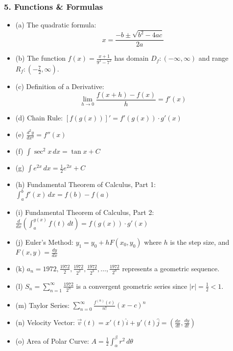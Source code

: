 \documentclass[a4paper,15pt]{article}
\begin{document}
\subsubsection*{5. Functions \& Formulas}
\begin{itemize}
    \item (a) The quadratic formula:
    \[
    x = \frac{-b \pm \sqrt{b^2 - 4ac}}{2a}
    \]
    \item (b) The function \(f(x) = \frac{x + 1}{9^2 - 7^2}\) has domain \(D_f : (-\infty, \infty)\) and range \(R_f : \left(-\frac{7}{2}, \infty\right)\).
    \item (c) Definition of a Derivative:
    \[
    \lim_{h \to 0} \frac{f(x + h) - f(x)}{h} = f'(x)
    \]
    \item (d) Chain Rule: \([f(g(x))]' = f'(g(x)) \cdot g'(x)\)
    \item (e) \(\frac{d^2y}{dx^2} = f''(x)\)
    \item (f) \(\int \sec^2 x \, dx = \tan x + C\)
    \item (g) \(\int e^{2x} \, dx = \frac{1}{2}e^{2x} + C\)
    \item (h) Fundamental Theorem of Calculus, Part 1: \(\int_a^b f'(x) \, dx = f(b) - f(a)\)
    \item (i) Fundamental Theorem of Calculus, Part 2: \(\frac{d}{dx} \left( \int_a^{g(x)} f(t) \, dt \right) = f(g(x)) \cdot g'(x)\)
    \item (j) Euler’s Method: \(y_1 = y_0 + hF(x_0, y_0)\) where \(h\) is the step size, and \(F(x, y) = \frac{dy}{dx}\)
    \item (k) \(a_n = 1972, \frac{1972}{2}, \frac{1972}{2^2}, \frac{1972}{2^3}, \ldots, \frac{1972}{2^n}\) represents a geometric sequence.
    \item (l) \(S_n = \sum_{n=1}^{\infty} \frac{1972}{2^n}\) is a convergent geometric series since \(|r| = \frac{1}{2} < 1\).
    \item (m) Taylor Series: \(\sum_{n=0}^{\infty} \frac{f^{(n)}(c)}{n!} (x - c)^n\)
    \item (n) Velocity Vector: \(\vec{v}(t) = x'(t)\hat{i} + y'(t)\hat{j} = \left(\frac{dx}{dt}, \frac{dy}{dt}\right)\)
    \item (o) Area of Polar Curve: \(A = \frac{1}{2} \int_\alpha^\beta r^2 \, d\theta\)
\end{itemize}
\end{document}
